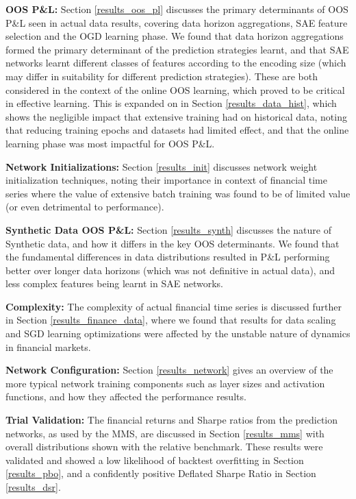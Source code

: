 \documentclass[a4paper,11pt,oneside]{article}
\theoremstyle{plain}
\theoremstyle{definition}
\begin{document}
	\textbf{OOS P\&L:} Section \ref{results_oos_pl} discusses the primary determinants of OOS P\&L seen in actual data results, covering data horizon aggregations, SAE feature selection and the OGD learning phase. We found that data horizon aggregations formed the primary determinant of the prediction strategies learnt, and that SAE networks learnt different classes of features according to the encoding size (which may differ in suitability for different prediction strategies). These are both considered in the context of the online OOS learning, which proved to be critical in effective learning. This is expanded on in Section \ref{results_data_hist}, which shows the negligible impact that extensive training had on historical data, noting that reducing training epochs and datasets had limited effect, and that the online learning phase was most impactful for OOS P\&L. \newline
	
	\textbf{Network Initializations:} Section \ref{results_init} discusses network weight initialization techniques, noting their importance in context of financial time series where the value of extensive batch training was found to be of limited value (or even detrimental to performance).\newline
	
	\textbf{Synthetic Data OOS P\&L:} Section \ref{results_synth} discusses the nature of Synthetic data, and how it differs in the key OOS determinants. We found that the fundamental differences in data distributions resulted in P\&L performing better over longer data horizons (which was not definitive in actual data), and less complex features being learnt in SAE networks.\newline
	
	\textbf{Complexity:} The complexity of actual financial time series is discussed further in Section \ref{results_finance_data}, where we found that results for data scaling and SGD learning optimizations were affected by the unstable nature of dynamics in financial markets.\newline
	
	\textbf{Network Configuration:} Section \ref{results_network} gives an overview of the more typical network training components such as layer sizes and activation functions, and how they affected the performance results.\newline
	
	\textbf{Trial Validation:} The financial returns and Sharpe ratios from the prediction networks, as used by the MMS, are discussed in Section \ref{results_mms} with overall distributions shown with the relative benchmark. These results were validated and showed a low likelihood of backtest overfitting in Section \ref{results_pbo}, and a confidently positive Deflated Sharpe Ratio in Section \ref{results_dsr}.  \newline
	
\end{document}
